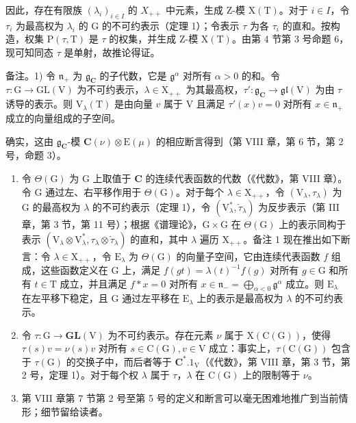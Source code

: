 因此，存在有限族 \((\lambda_{i})_{i\in I}\) 的 \(X_{++}\) 中元素，生成 Z-模 \(\mathrm{X(T)}\)。对于 \(i\in I\)，令 \(\tau_{i}\) 为最高权为 \(\lambda_{i}\) 的 G 的不可约表示（定理 1）；令表示 \(\tau\) 为各 \(\tau_{i}\) 的直和。按构造，权集 \(\mathrm{P}(\tau,\mathrm{T})\) 是 \(\tau\) 的权集，并生成 Z-模 \(\mathrm{X(T)}\)。由第 4 节第 3 号命题 6，现可知同态 \(\tau\) 是单射，故推论得证。

备注。1) 令 \(\mathfrak{n}_{+}\) 为 \(\mathfrak{g}_{\mathbf{C}}\) 的子代数，它是 \(\mathfrak{g}^{\alpha}\) 对所有 \(\alpha > 0\) 的和。令 \(\tau: \mathrm{G} \to \mathrm{GL}(\mathrm{V})\) 为不可约表示，\(\lambda \in \mathrm{X}_{++}\) 为其最高权，\(\tau': \mathfrak{g}_{\mathbf{C}} \to \mathfrak{gl}(\mathrm{V})\) 为由 \(\tau\) 诱导的表示。则 \(\mathrm{V}_{\lambda}(\mathrm{T})\) 是由向量 \(v\) 属于 \(\mathrm{V}\) 且满足 \(\tau'(x)v = 0\) 对所有 \(x \in \mathfrak{n}_{+}\) 成立的向量组成的子空间。

确实，这由 \(\mathfrak{g}_{\mathbf{C}}\)-模 \(\mathbf{C}(\nu) \otimes \mathrm{E}(\mu)\) 的相应断言得到（第 VIII 章，第 6 节，第 2 号，命题 3）。

\begin{enumerate}
\def\labelenumi{\arabic{enumi})}
\setcounter{enumi}{1}
\item
  令 \(\Theta(\mathrm{G})\) 为 \(\mathrm{G}\) 上取值于 \(\mathbf{C}\) 的连续代表函数的代数（《代数》，第 VIII 章）。令 \(\mathrm{G}\) 通过左、右平移作用于 \(\Theta(\mathrm{G})\)。对于每个 \(\lambda \in \mathrm{X}_{++}\)，令 \((\mathrm{V}_{\lambda}, \tau_{\lambda})\) 为 \(\mathrm{G}\) 的最高权为 \(\lambda\) 的不可约表示（定理 1），令 \((\mathrm{V}_{\lambda}^{*}, \check{\tau}_{\lambda})\) 为反步表示（第 III 章，第 3 节，第 11 号）；根据《谱理论》，\(\mathrm{G} \times \mathrm{G}\) 在 \(\Theta(\mathrm{G})\) 上的表示同构于表示 \((\mathrm{V}_{\lambda} \otimes \mathrm{V}_{\lambda}^{*}, \tau_{\lambda} \otimes \check{\tau}_{\lambda})\) 的直和，其中 \(\lambda\) 遍历 \(\mathrm{X}_{++}\)。备注 1 现在推出如下断言：令 \(\lambda \in \mathrm{X}_{++}\)，令 \(\mathrm{E}_{\lambda}\) 为 \(\Theta(\mathrm{G})\) 的向量子空间，它由连续代表函数 \(f\) 组成，这些函数定义在 \(\mathrm{G}\) 上，满足 \(f(gt) = \lambda(t)^{-1} f(g)\) 对所有 \(g \in \mathrm{G}\) 和所有 \(t \in \mathrm{T}\) 成立，并且满足 \(f * x = 0\) 对所有 \(x \in \mathfrak{n}_{-} = \bigoplus_{\alpha < 0} \mathfrak{g}^{\alpha}\) 成立。则 \(\mathrm{E}_{\lambda}\) 在左平移下稳定，且 \(\mathrm{G}\) 通过左平移在 \(\mathrm{E}_{\lambda}\) 上的表示是最高权为 \(\lambda\) 的不可约表示。
\item
  令 \(\tau : \mathrm{G} \to \mathbf{GL}(\mathrm{V})\) 为不可约表示。存在元素 \(\nu\) 属于 \(\mathrm{X}(\mathrm{C}(\mathrm{G}))\)，使得 \(\tau(s)v = \nu(s)v\) 对所有 \(s \in \mathrm{C}(\mathrm{G}), v \in \mathrm{V}\) 成立：事实上，\(\tau(\mathrm{C}(\mathrm{G}))\) 包含于 \(\tau(\mathrm{G})\) 的交换子中，而后者等于 \(\mathbf{C}^*.1_{\mathrm{V}}\)（《代数》，第 VIII 章，第 3 节，第 2 号，定理 1）。对于每个权 \(\lambda\) 属于 \(\tau\)，\(\lambda\) 在 \(\mathrm{C}(\mathrm{G})\) 上的限制等于 \(\nu\)。
\item
  第 VIII 章第 7 节第 2 号至第 5 号的定义和断言可以毫无困难地推广到当前情形；细节留给读者。
\end{enumerate}

